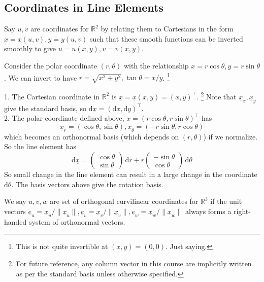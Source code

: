 \subsection{Coordinates in Line Elements}
Say $u,v$ are coordinates for $\mathbb R^2$ by relating them to Cartesians in the form $x=x(u,v),y=y(u,v)$ such that these smooth functions can be inverted smoothly to give $u=u(x,y),v=v(x,y)$.
\begin{example}
    Consider the polar coordinate $(r,\theta)$ with the relationship $x=r\cos\theta,y=r\sin\theta$.
    We can invert to have $r=\sqrt{x^2+y^2},\tan\theta=x/y$.
    \footnote{This is not quite invertible at $(x,y)=(0,0)$.
    Just saying.}
\end{example}
\begin{example}
    1. The Cartesian coordinate in $\mathbb R^2$ is $\underline{x}=\underline{x}(x,y)=(x,y)^\top$.
    \footnote{For future reference, any column vector in this course are implicitly written as per the standard basis unless otherwise specified.}
    Note that $\underline{x}_x,\underline{x}_y$ give the standard basis, so $\mathrm d\underline{x}=(\mathrm dx,\mathrm dy)^\top$.\\
    2. The polar coordinate defined above, $\underline{x}=(r\cos\theta,r\sin\theta)^\top$ has
    $$\underline{x}_r=(\cos\theta,\sin\theta),\underline{x}_\theta=(-r\sin\theta,r\cos\theta)$$
    which becomes an orthonormal basis (which depends on $(r,\theta)$) if we normalize.
    So the line element has
    $$\mathrm d\underline{x}=\begin{pmatrix}
        \cos\theta\\\sin\theta
    \end{pmatrix}\,\mathrm dr+r\begin{pmatrix}
        -\sin\theta\\\cos\theta
    \end{pmatrix}\,\mathrm d\theta$$
    So small change in the line element can result in a large change in the coordinate $\mathrm d\theta$.
    The basis vectors above give the rotation basis.
\end{example}
\begin{definition}
    We say $u,v,w$ are set of orthogonal curvilinear coordinates for $\mathbb R^3$ if the unit vectors $\underline{e}_u=\underline{x}_u/\|\underline{x}_u\|,\underline{e}_v=\underline{x}_v/\|\underline{x}_v\|,\underline{e}_w=\underline{x}_w/\|\underline{x}_w\|$ always forms a right-handed system of orthonormal vectors.
\end{definition}
